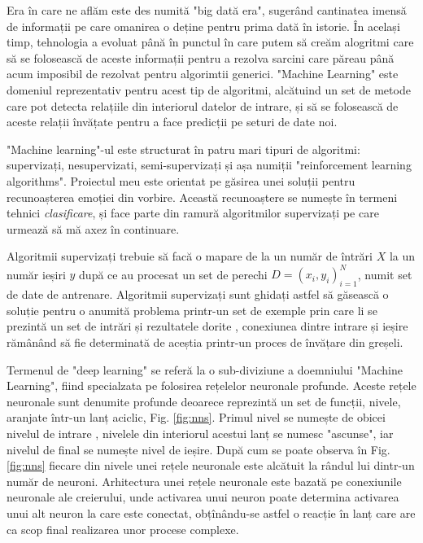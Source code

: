 \documentclass[a4paper,12pt]{book}
\begin{document}
			Era în care ne aflăm este des numită "big dată era", sugerând cantinatea imensă de informații pe care omanirea o deține pentru prima dată în istorie. În același timp, tehnologia a evoluat până în punctul în care putem să creăm alogritmi care să se folosească de aceste informații pentru a rezolva sarcini care păreau până acum imposibil de rezolvat pentru algorimtii generici. "Machine Learning" este domeniul reprezentativ pentru acest tip de algoritmi, alcătuind un set de metode care pot detecta relațiile din interiorul datelor de intrare, și să se folosească de aceste relații învățate pentru a face predicții pe seturi de date noi. \par
			
			"Machine learning"-ul este structurat în patru mari tipuri de algoritmi: supervizați, nesupervizati, semi-supervizați și așa numiții "reinforcement learning algorithms". Proiectul meu este orientat pe găsirea unei soluții pentru recunoașterea emoției din vorbire. Această recunoaștere se numește în termeni tehnici \textit{clasificare}, și face parte din ramură algoritmilor supervizați pe care urmează să mă axez în continuare. \par 
			Algoritmii supervizați trebuie să facă o mapare de la un număr de întrări $X$ la un număr ieșiri $y$ după ce au procesat un set de perechi $D={(x_i,y_i)}^N_{i=1}$, numit set de date de antrenare. Algoritmii supervizați sunt ghidați astfel să găsească o soluție pentru o anumită problema printr-un set de exemple prin care li se prezintă un set de intrări și rezultatele dorite , conexiunea dintre intrare și ieșire rămânând să fie determinată de aceștia printr-un proces de învățare din greșeli. \par
			
			Termenul de "deep learning" se referă la o sub-diviziune a doemniului "Machine Learning", fiind specialzata pe folosirea rețelelor neuronale profunde. Aceste rețele neuronale sunt denumite profunde deoarece reprezintă un set de funcții, nivele, aranjate într-un lanț aciclic, Fig. \ref{fig:nns}. Primul nivel se numește de obicei nivelul de intrare , nivelele din interiorul acestui lanț se numesc "ascunse", iar nivelul de final se numește nivel de ieșire. După cum se poate observa în Fig. \ref{fig:nns} fiecare din nivele unei rețele neuronale este alcătuit la rândul lui dintr-un număr de neuroni. Arhitectura unei rețele neuronale este bazată pe conexiunile neuronale ale creierului, unde activarea unui neuron poate determina activarea unui alt neuron la care este conectat, obțînându-se astfel o reacție în lanț care are ca scop final realizarea unor procese complexe. 
			
\end{document}
